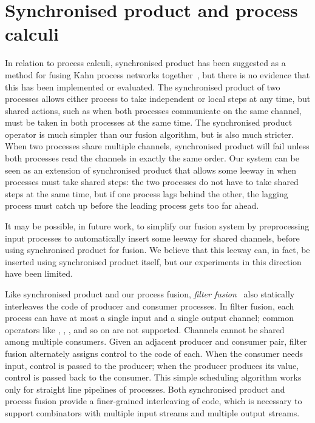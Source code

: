 \section{Synchronised product and process calculi}
\label{related/synchronised-product}

In relation to process calculi, synchronised product has been suggested as a method for fusing Kahn process networks together~\cite{fradet2004network}, but there is no evidence that this has been implemented or evaluated.
The synchronised product of two processes allows either process to take independent or local steps at any time, but shared actions, such as when both processes communicate on the same channel, must be taken in both processes at the same time.
The synchronised product operator is much simpler than our fusion algorithm, but is also much stricter.
When two processes share multiple channels, synchronised product will fail unless both processes read the channels in exactly the same order.
Our system can be seen as an extension of synchronised product that allows some leeway in when processes must take shared steps: the two processes do not have to take shared steps at the same time, but if one process lags behind the other, the lagging process must catch up before the leading process gets too far ahead.

It may be possible, in future work, to simplify our fusion system by preprocessing input processes to automatically insert some leeway for shared channels, before using synchronised product for fusion.
We believe that this leeway can, in fact, be inserted using synchronised product itself, but our experiments in this direction have been limited.

Like synchronised product and our process fusion, \emph{filter fusion}~\citep{proebsting1996filter} also statically interleaves the code of producer and consumer processes.
In filter fusion, each process can have at most a single input and a single output channel; common operators like \Hs@zip@, \Hs@unzip@, \Hs@append@, \Hs@partition@ and so on are not supported.
Channels cannot be shared among multiple consumers.
Given an adjacent producer and consumer pair, filter fusion alternately assigns control to the code of each.
When the consumer needs input, control is passed to the producer; when the producer produces its value, control is passed back to the consumer.
This simple scheduling algorithm works only for straight line pipelines of processes.
Both synchronised product and process fusion provide a finer-grained interleaving of code, which is necessary to support combinators with multiple input streams and multiple output streams.

